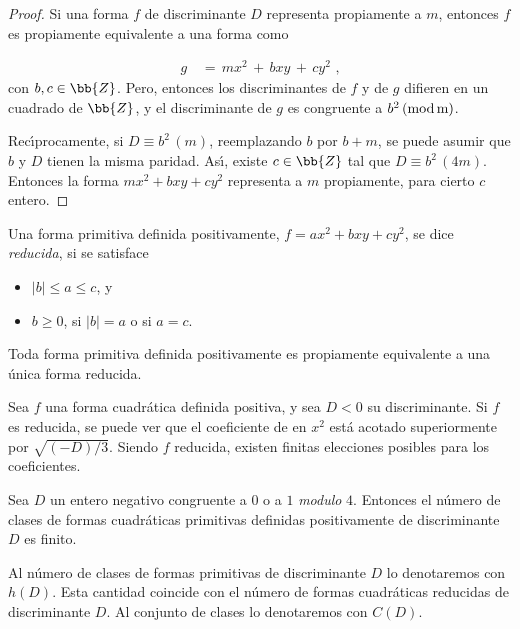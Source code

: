 \begin{proof}
Si una forma $f$ de discriminante $D$ representa propiamente a $m$,
entonces $f$ es propiamente equivalente a una forma como

\begin{align*}
g & \,=\,mx^{2}\,+\,bxy\,+\,cy^{2}\text{ ,}
\end{align*}
con $b,c\in\bb{Z}$. Pero, entonces los discriminantes de $f$ y de $g$
difieren en un cuadrado de $\bb{Z}$, y el discriminante de $g$ es
congruente a $b^{2}\,(\rm{mod}\,m)$.

Rec\'{\i}procamente, si $D\equiv b^{2}\,(m)$, reemplazando $b$ por
$b+m$, se puede asumir que $b$ y $D$ tienen la misma paridad. As\'{\i},
existe $c\in\bb{Z}$ tal que $D\equiv b^{2}\,(4m)$. Entonces la forma
$mx^{2}+bxy+cy^{2}$ representa a $m$ propiamente, para cierto $c$
entero.
\end{proof}

Una forma primitiva definida positivamente, $f=ax^{2}+bxy+cy^{2}$,
se dice \emph{reducida}, si se satisface

\begin{itemize}
\item $|b|\leq a\leq c$, y
\item $b\geq 0$, si $|b|=a$ o si $a=c$.
\end{itemize}

\begin{definicionesTeoFormasPrimitivasEquivalenciaPropia}
Toda forma primitiva definida positivamente es propiamente
equivalente a una \'{u}nica forma reducida.
\end{definicionesTeoFormasPrimitivasEquivalenciaPropia}

Sea $f$ una forma cuadr\'{a}tica definida positiva, y sea $D<0$
su discriminante. Si $f$ es reducida, se puede ver que el coeficiente
de en $x^{2}$ est\'{a} acotado superiormente por $\sqrt{(-D)/3}$.
Siendo $f$ reducida, existen finitas elecciones posibles para los
coeficientes.

\begin{definicionesTeoNumDeClases}
Sea $D$ un entero negativo congruente a $0$ o a $1$ \textit{modulo}
$4$. Entonces el n\'{u}mero de clases de formas cuadr\'{a}ticas
primitivas definidas positivamente de discriminante $D$ es finito.
\end{definicionesTeoNumDeClases}

Al n\'{u}mero de clases de formas primitivas de discriminante $D$
lo denotaremos con $h(D)$. Esta cantidad coincide con el n\'{u}mero de
formas cuadr\'{a}ticas reducidas de discriminante $D$. Al conjunto de
clases lo denotaremos con $C(D)$.

